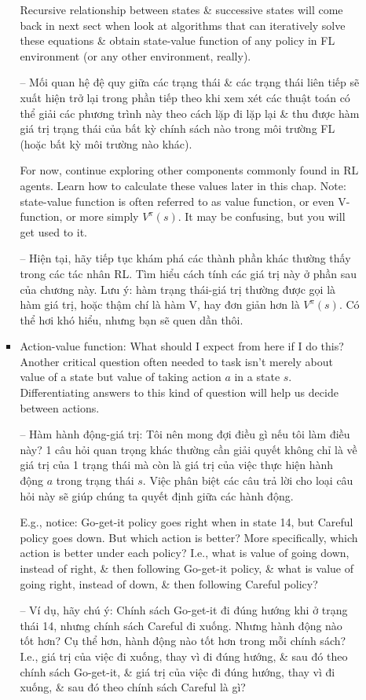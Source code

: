 \documentclass{article}
\begin{document}
\begin{itemize}
\begin{itemize}
\begin{itemize}
            Recursive relationship between states \& successive states will come back in next sect when look at algorithms that can iteratively solve these equations \& obtain state-value function of any policy in FL environment (or any other environment, really).

            -- Mối quan hệ đệ quy giữa các trạng thái \& các trạng thái liên tiếp sẽ xuất hiện trở lại trong phần tiếp theo khi xem xét các thuật toán có thể giải các phương trình này theo cách lặp đi lặp lại \& thu được hàm giá trị trạng thái của bất kỳ chính sách nào trong môi trường FL (hoặc bất kỳ môi trường nào khác).

            For now, continue exploring other components commonly found in RL agents. Learn how to calculate these values later in this chap. Note: state-value function is often referred to as value function, or even V-function, or more simply $V^\pi(s)$. It may be confusing, but you will get used to it.

            -- Hiện tại, hãy tiếp tục khám phá các thành phần khác thường thấy trong các tác nhân RL. Tìm hiểu cách tính các giá trị này ở phần sau của chương này. Lưu ý: hàm trạng thái-giá trị thường được gọi là hàm giá trị, hoặc thậm chí là hàm V, hay đơn giản hơn là $V^\pi(s)$. Có thể hơi khó hiểu, nhưng bạn sẽ quen dần thôi.
            \item {\sf Action-value function: What should I expect from here if I do this?} Another critical question often needed to task isn't merely about value of a state but value of taking action $a$ in a state $s$. Differentiating answers to this kind of question will help us decide between actions.

            -- {\sf Hàm hành động-giá trị: Tôi nên mong đợi điều gì nếu tôi làm điều này?} 1 câu hỏi quan trọng khác thường cần giải quyết không chỉ là về giá trị của 1 trạng thái mà còn là giá trị của việc thực hiện hành động $a$ trong trạng thái $s$. Việc phân biệt các câu trả lời cho loại câu hỏi này sẽ giúp chúng ta quyết định giữa các hành động.

            E.g., notice: Go-get-it policy goes right when in state 14, but Careful policy goes down. But which action is better? More specifically, which action is better under each policy? I.e., what is value of going down, instead of right, \& then following Go-get-it policy, \& what is value of going right, instead of down, \& then following Careful policy?

            -- Ví dụ, hãy chú ý: Chính sách Go-get-it đi đúng hướng khi ở trạng thái 14, nhưng chính sách Careful đi xuống. Nhưng hành động nào tốt hơn? Cụ thể hơn, hành động nào tốt hơn trong mỗi chính sách? I.e., giá trị của việc đi xuống, thay vì đi đúng hướng, \& sau đó theo chính sách Go-get-it, \& giá trị của việc đi đúng hướng, thay vì đi xuống, \& sau đó theo chính sách Careful là gì?


\end{itemize}
\end{itemize}
\end{itemize}
\end{document}
